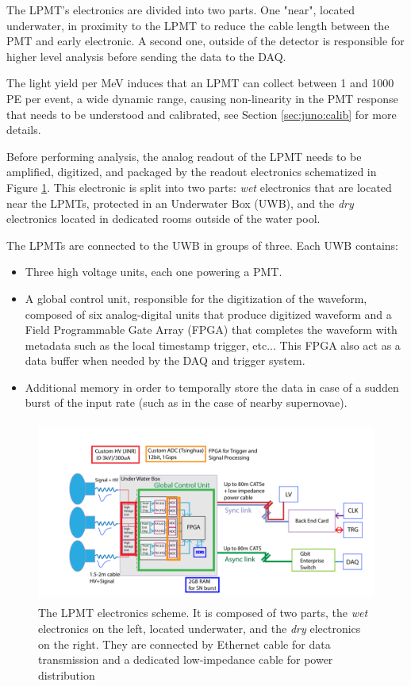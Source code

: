 \documentclass[../main.tex]{subfiles}
\begin{document}
The LPMT's electronics are divided into two parts. One "near", located underwater, in proximity to the LPMT to reduce the cable length between the PMT and early electronic. A second one, outside of the detector is responsible for higher level analysis before sending the data to the DAQ.

The light yield per MeV induces that an LPMT can collect between 1 and 1000 PE per event, a wide dynamic range,  causing non-linearity in the PMT response that needs to be understood and calibrated, see Section \ref{sec:juno:calib} for more details.

Before performing analysis, the analog readout of the LPMT needs to be amplified, digitized, and packaged by the readout electronics schematized in Figure \ref{fig:juno:lpmt_elec}. This electronic is split into two parts: \textit{wet} electronics that are located near the LPMTs, protected in an Underwater Box (UWB), and the \textit{dry} electronics located in dedicated rooms outside of the water pool.

The LPMTs are connected to the UWB in groups of three. Each UWB contains:
\begin{itemize}
  \item Three high voltage units, each one powering a PMT.
  \item A global control unit, responsible for the digitization of the waveform, composed of six analog-digital units that produce digitized waveform and a Field Programmable Gate Array (FPGA) that completes the waveform with metadata such as the local timestamp trigger, etc... This FPGA also act as a data buffer when needed by the DAQ and trigger system.
  \item Additional memory in order to temporally store the data in case of a sudden burst of the input rate (such as in the case of nearby supernovae).
\end{itemize}

\begin{figure}[ht]
  \centering
  \includegraphics[height=6cm]{images/juno/LPMT_readout.png}
  \caption{The LPMT electronics scheme. It is composed of two parts, the \textit{wet} electronics on the left, located underwater, and the \textit{dry} electronics on the right. They are connected by Ethernet cable for data transmission and a dedicated low-impedance cable for power distribution}
  \label{fig:juno:lpmt_elec}
\end{figure}
\end{document}
